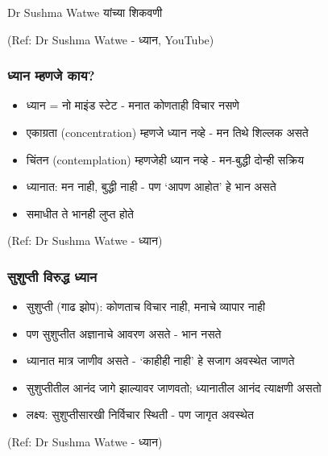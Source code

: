 \begin{frame}[fragile]\frametitle{}
\begin{center}
{\Large Dr Sushma Watwe यांच्या शिकवणी}
\end{center}

{\tiny (Ref: Dr Sushma Watwe - ध्यान, YouTube)}

\end{frame}

\begin{frame}[fragile]\frametitle{ध्यान म्हणजे काय?}

	\begin{itemize}
	\item ध्यान = नो माइंड स्टेट - मनात कोणताही विचार नसणे
	\item एकाग्रता (concentration) म्हणजे ध्यान नव्हे - मन तिथे शिल्लक असते
	\item चिंतन (contemplation) म्हणजेही ध्यान नव्हे - मन-बुद्धी दोन्ही सक्रिय
	\item ध्यानात: मन नाही, बुद्धी नाही - पण `आपण आहोत' हे भान असते
	\item समाधीत ते भानही लुप्त होते
	\end{itemize}

{\tiny (Ref: Dr Sushma Watwe - ध्यान)}

\end{frame}

\begin{frame}[fragile]\frametitle{सुशुप्ती विरुद्ध ध्यान}

	\begin{itemize}
	\item सुशुप्ती (गाढ झोप): कोणताच विचार नाही, मनाचे व्यापार नाही
	\item पण सुशुप्तीत अज्ञानाचे आवरण असते - भान नसते
	\item ध्यानात मात्र जाणीव असते - `काहीही नाही' हे सजाग अवस्थेत जाणते
	\item सुशुप्तीतील आनंद जागे झाल्यावर जाणवतो; ध्यानातील आनंद त्याक्षणी असतो
	\item लक्ष्य: सुशुप्तीसारखी निर्विचार स्थिती - पण जागृत अवस्थेत
	\end{itemize}

{\tiny (Ref: Dr Sushma Watwe - ध्यान)}

\end{frame}

